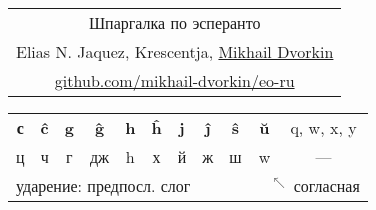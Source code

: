 \documentclass{article}
\def\b#1{\textbf{#1}}
\begin{document}
\hspace{2em}
\begin{tabular}{c}
{\Huge Шпаргалка по эсперанто} \\
{\small Elias N. Jaquez, Krescentja, \href{http://dvorkin.me/}{Mikhail Dvorkin}} \\
{\small \href{https://github.com/mikhail-dvorkin/eo-ru}{github.com/mikhail-dvorkin/eo-ru}} \\
\end{tabular}
\qquad
\begin{tabular}{|c|c|c|c|c|c|c|c|c|c|c|}
\hline
\b{с} & \b{ĉ} & \b{g} & \b{ĝ} & \b{h} & \b{ĥ} & \b{j} & \b{ĵ} & \b{ŝ} & \b{ŭ} & q, w, x, y \\
ц & ч & г & дж & h & х & й & ж & ш & w & --- \\
\hline
\multicolumn{9}{l}{ударение: предпосл. слог} & \multicolumn{2}{l}{{\tiny ~~$^\nwarrow$~}согласная} \\
\end{tabular}
\end{document}
